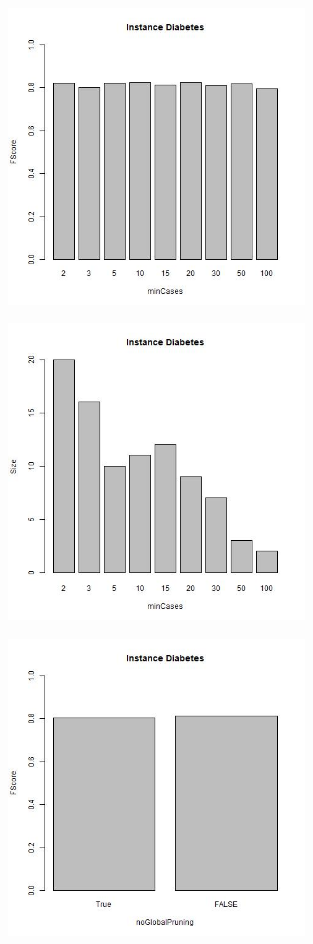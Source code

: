 \documentclass[12pt,a4paper]{article}
\begin{document}
\begin{figure}[H]
\centering
\includegraphics[width=0.7\textwidth]{diabetesFScoreMinCases.jpg}
\end{figure}

\begin{figure}[H]
\centering
\includegraphics[width=0.7\textwidth]{diabetesSizeMinCases.jpg}
\end{figure}

\begin{figure}[H]
\centering
\includegraphics[width=0.7\textwidth]{diabetesFScoreNoGlobalPruning.jpg}
\end{figure}
\end{document}
